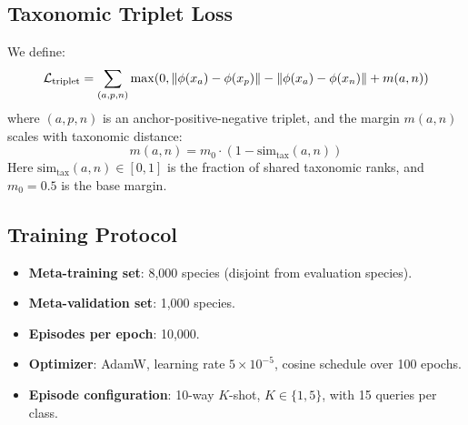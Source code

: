 \subsection{Taxonomic Triplet Loss}

We define:
\begin{equation}
  \mathcal{L}_{\text{triplet}} = \sum_{(a, p, n)} \max(0,
  \|\phi(x_a) - \phi(x_p)\| - \|\phi(x_a) - \phi(x_n)\| + m(a, n))
\end{equation}
where $(a, p, n)$ is an anchor-positive-negative triplet, and the margin
$m(a, n)$ scales with taxonomic distance:
\begin{equation}
  m(a, n) = m_0 \cdot (1 - \text{sim}_{\text{tax}}(a, n))
\end{equation}
Here $\text{sim}_{\text{tax}}(a, n) \in [0, 1]$ is the fraction of
shared taxonomic ranks, and $m_0 = 0.5$ is the base margin.

\subsection{Training Protocol}

\begin{itemize}
  \item \textbf{Meta-training set}: 8{,}000 species (disjoint from
    evaluation species).
  \item \textbf{Meta-validation set}: 1{,}000 species.
  \item \textbf{Episodes per epoch}: 10{,}000.
  \item \textbf{Optimizer}: AdamW, learning rate $5 \times 10^{-5}$,
    cosine schedule over 100 epochs.
  \item \textbf{Episode configuration}: 10-way $K$-shot, $K \in
    \{1, 5\}$, with 15 queries per class.
\end{itemize}


